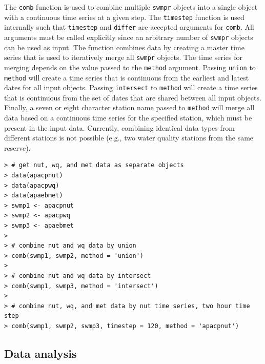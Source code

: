 \documentclass[10pt,letterpaper]{article}\usepackage[]{graphicx}\usepackage[]{color}
\makeatletter
\newenvironment{kframe}{%
 \def\at@end@of@kframe{}%
 \ifinner\ifhmode%
  \def\at@end@of@kframe{\end{minipage}}%
  \begin{minipage}{\columnwidth}%
 \fi\fi%
 \def\FrameCommand##1{\hskip\@totalleftmargin \hskip-\fboxsep
 \colorbox{shadecolor}{##1}\hskip-\fboxsep
     \hskip-\linewidth \hskip-\@totalleftmargin \hskip\columnwidth}%
 \MakeFramed {\advance\hsize-\width
   \@totalleftmargin\z@ \linewidth\hsize
   \@setminipage}}%
 {\par\unskip\endMakeFramed%
 \at@end@of@kframe}
\newenvironment{knitrout}{}{} %
\makeatother
\begin{document}
The \texttt{comb} function is used to combine multiple \texttt{swmpr} objects into a single object with a continuous time series at a given step.  The \texttt{timestep} function is used internally such that \texttt{timestep} and \texttt{differ} are accepted arguments for \texttt{comb}.  All arguments must be called explicitly since an arbitrary number of \texttt{swmpr} objects can be used as input.  The function combines data by creating a master time series that is used to iteratively merge all \texttt{swmpr} objects.  The time series for merging depends on the value passed to the \texttt{method} argument.  Passing \texttt{union} to \texttt{method} will create a time series that is continuous from the earliest and latest dates for all input objects.  Passing \texttt{intersect} to \texttt{method} will create a time series that is continuous from the set of dates that are shared between all input objects.  Finally, a seven or eight character station name passed to \texttt{method} will merge all data based on a continuous time series for the specified station, which must be present in the input data.  Currently, combining identical data types from different stations is not possible (e.g., two water quality stations from the same reserve).  

\begin{knitrout}\small
{}\color{fgcolor}\begin{kframe}
\begin{verbatim}
> # get nut, wq, and met data as separate objects
> data(apacpnut)
> data(apacpwq)
> data(apaebmet)
> swmp1 <- apacpnut
> swmp2 <- apacpwq
> swmp3 <- apaebmet
> 
> # combine nut and wq data by union
> comb(swmp1, swmp2, method = 'union')
> 
> # combine nut and wq data by intersect
> comb(swmp1, swmp3, method = 'intersect')
> 
> # combine nut, wq, and met data by nut time series, two hour time step
> comb(swmp1, swmp2, swmp3, timestep = 120, method = 'apacpnut')
\end{verbatim}
\end{kframe}
\end{knitrout}

\subsection*{Data analysis}
\end{document}
